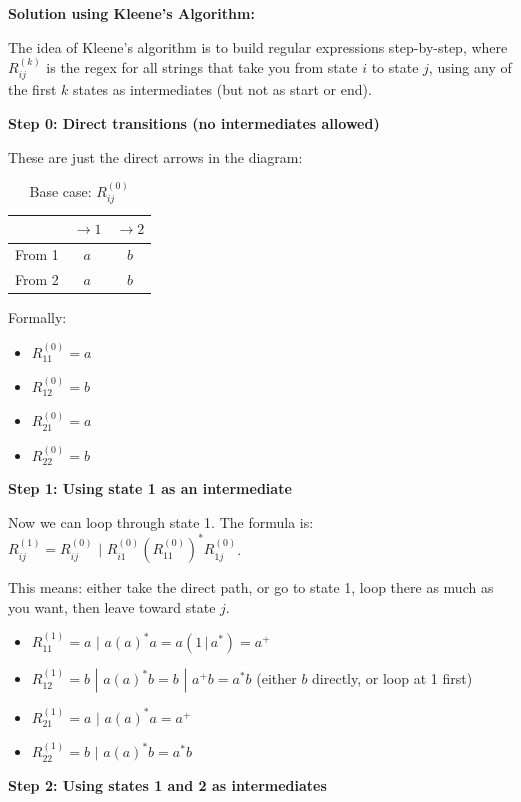 \documentclass{article}
\theoremstyle{theorem}
\theoremstyle{definition}
\theoremstyle{remark}
\begin{document}
\textbf{Solution using Kleene's Algorithm:}

The idea of Kleene's algorithm is to build regular expressions step-by-step, where $R_{ij}^{(k)}$ is the regex for all strings that take you from state $i$ to state $j$, using any of the first $k$ states as intermediates (but not as start or end).

\textbf{Step 0: Direct transitions (no intermediates allowed)}

These are just the direct arrows in the diagram:

\begin{table}[H]
  \centering
  \begin{tabular}{|c|c|c|}
    \hline
    & $\to 1$ & $\to 2$ \\ \hline
    From 1 & $a$ & $b$ \\ \hline
    From 2 & $a$ & $b$ \\ \hline
  \end{tabular}
  \caption{Base case: $R_{ij}^{(0)}$}
\end{table}

Formally:
\begin{itemize}
  \item $R_{11}^{(0)} = a$
  \item $R_{12}^{(0)} = b$
  \item $R_{21}^{(0)} = a$
  \item $R_{22}^{(0)} = b$
\end{itemize}

\textbf{Step 1: Using state 1 as an intermediate}

Now we can loop through state 1. The formula is: $R_{ij}^{(1)} = R_{ij}^{(0)} \,\, | \,\, R_{i1}^{(0)} (R_{11}^{(0)})^* R_{1j}^{(0)}$.

This means: either take the direct path, or go to state 1, loop there as much as you want, then leave toward state $j$.

\begin{itemize}
  \item $R_{11}^{(1)} = a \,\, | \,\, a(a)^*a = a(1 \,|\, a^*) = a^+$
  \item $R_{12}^{(1)} = b \,\, | \,\, a(a)^*b = b \,\, | \,\, a^+b = a^*b$ (either $b$ directly, or loop at 1 first)
  \item $R_{21}^{(1)} = a \,\, | \,\, a(a)^*a = a^+$
  \item $R_{22}^{(1)} = b \,\, | \,\, a(a)^*b = a^*b$
\end{itemize}

\textbf{Step 2: Using states 1 and 2 as intermediates}
\end{document}
